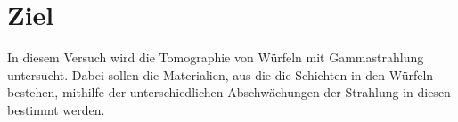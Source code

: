 \section{Ziel}
\label{sec:Ziel}

In diesem Versuch wird die Tomographie von Würfeln mit Gammastrahlung untersucht. Dabei sollen die Materialien, aus die die Schichten in den Würfeln bestehen, mithilfe der unterschiedlichen Abschwächungen der Strahlung in diesen bestimmt werden.
